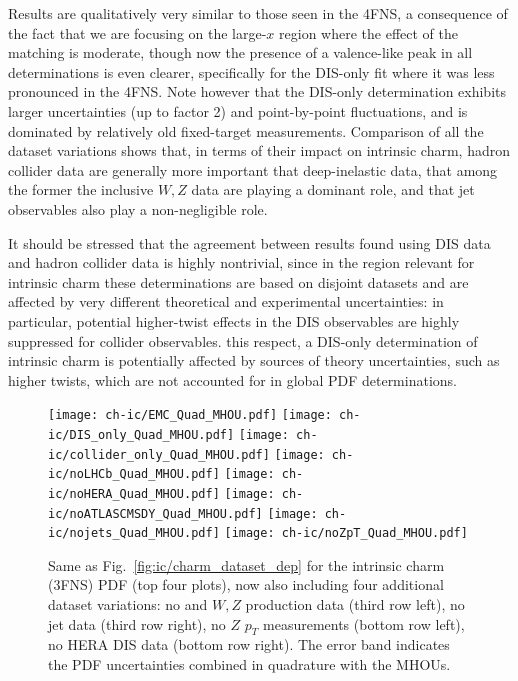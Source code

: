 Results are qualitatively very similar to those seen in the 4FNS, a
consequence of the fact that we are focusing on the large-$x$ region where the
effect of the matching is moderate, though now the presence of a
valence-like peak in all determinations is even clearer, specifically
for the DIS-only fit where it was less pronounced in the 4FNS.
%
 Note however that the DIS-only determination
  exhibits larger uncertainties
  (up to factor 2) and point-by-point fluctuations,
  and is dominated by relatively old fixed-target measurements.
%
Comparison of all the dataset variations shows that, in terms of their
impact on intrinsic charm,
hadron collider data are generally more important
that deep-inelastic data, that among the former the
\lhcb inclusive $W,Z$ data are playing a dominant role,
and that jet observables also play a non-negligible role.

It should be stressed that the agreement between results found using
DIS data and hadron collider data is highly nontrivial, since in the region
relevant for intrinsic charm these determinations are based on disjoint datasets
and are  affected by
very different theoretical and experimental uncertainties:
in particular, potential higher-twist
effects in the DIS observables are highly suppressed for collider observables.
%
 this respect, a DIS-only determination of intrinsic charm
  is potentially affected by sources of theory uncertainties, such as higher twists,
which are not accounted for in global PDF determinations.

\begin{figure}[h]
  \begin{center}
    \texttt{[image: ch-ic/EMC\_Quad\_MHOU.pdf]}
    \texttt{[image: ch-ic/DIS\_only\_Quad\_MHOU.pdf]}
    \texttt{[image: ch-ic/collider\_only\_Quad\_MHOU.pdf]}
    \texttt{[image: ch-ic/noLHCb\_Quad\_MHOU.pdf]}
    \texttt{[image: ch-ic/noHERA\_Quad\_MHOU.pdf]}
    \texttt{[image: ch-ic/noATLASCMSDY\_Quad\_MHOU.pdf]}
    \texttt{[image: ch-ic/nojets\_Quad\_MHOU.pdf]}
    \texttt{[image: ch-ic/noZpT\_Quad\_MHOU.pdf]}
    \caption{\small Same as Fig.~\ref{fig:ic/charm_dataset_dep}
      for the intrinsic charm (3FNS) PDF (top four plots), now also including
      four additional dataset variations:  no \atlas and \cms $W, Z$
      production data   (third row left),
      no jet data (third row right), no $Z$ $p_T$
      measurements (bottom row left), no HERA
      DIS data (bottom row right).
The error band indicates the PDF uncertainties combined in quadrature with the MHOUs.
\label{fig:ic/charm_dataset_dep_nf3} }
\end{center}
\end{figure}

